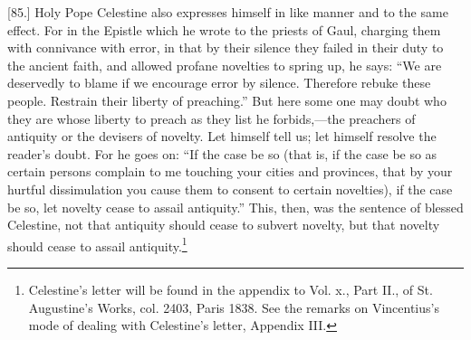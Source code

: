 [85.] Holy Pope Celestine also expresses himself in like manner and to the same effect. For in the Epistle which he wrote to the priests of Gaul, charging them with connivance with error, in that by their silence they failed in their duty to the ancient faith, and allowed profane novelties to spring up, he says: “We are deservedly to blame if we encourage error by silence. Therefore rebuke these people. Restrain their liberty of preaching.” But here some one may doubt who they are whose liberty to preach as they list he forbids,—the preachers of antiquity or the devisers of novelty. Let himself tell us; let himself resolve the reader’s doubt. For he goes on: “If the case be so (that is, if the case be so as certain persons complain to me touching your cities and provinces, that by your hurtful dissimulation you cause them to consent to certain novelties), if the case be so, let novelty cease to assail antiquity.” This, then, was the sentence of blessed Celestine, not that antiquity should cease to subvert novelty, but that novelty should cease to assail antiquity.\footnote{Celestine’s letter will be found in the appendix to Vol. x., Part II., of St. Augustine’s Works, col. 2403, Paris 1838. See the remarks on Vincentius’s mode of dealing with Celestine’s letter, Appendix III.}


